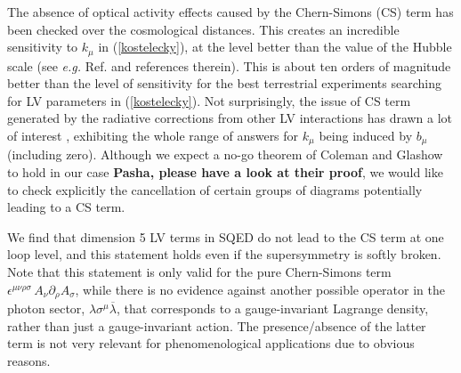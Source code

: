 \documentclass[paper,12pt]{revtex4}
\begin{document}
    The absence of optical activity effects caused by the Chern-Simons (CS) term 
    has been checked over the cosmological distances. This creates an 
    incredible sensitivity to $k_\mu$ in (\ref{kostelecky}), at the level better 
    than the value of the Hubble scale (see {\em e.g.} Ref. \cite{CFJ} and references therein). 
   This is about ten orders of magnitude 
    better than the level of sensitivity for the best terrestrial experiments searching for 
    LV parameters in (\ref{kostelecky}). Not surprisingly, the issue of 
	CS term generated by the radiative corrections from other LV interactions 
    has drawn a lot of interest \cite{CG,Jackiw:1999yp,Chung:1998jv,Andrianov:2001zj}, 
    exhibiting the whole range of answers for $k_\mu$ being induced by $b_\mu$ 
(including zero). Although we expect a no-go theorem of Coleman and Glashow \cite{CG}
to hold in our case {\bf Pasha, please have a look at their proof}, 
we would like to check explicitly the cancellation of certain groups of diagrams 
potentially leading to a CS term. 
	
	We find that dimension 5 LV terms in SQED do not lead to the CS term at one loop level,
	and this statement holds even if the supersymmetry is softly broken.
 	Note that this statement is only valid for the pure Chern-Simons term
	$ \epsilon^{\mu\nu\rho\sigma}\, A_\nu \partial_\rho A_\sigma $, 
	while there is no evidence against another possible operator in the 
    photon sector,  $ \lambda \sigma^\mu \overline{\lambda} $,
    that corresponds to a gauge-invariant Lagrange density, rather than just a 
    gauge-invariant action. The presence/absence of the latter term is not very relevant for
	phenomenological applications due to obvious reasons. 
	
\end{document}
